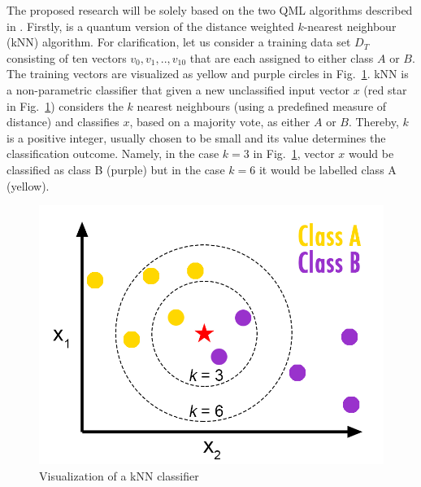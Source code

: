 \documentclass[a4paper]{article}
\newcommand*{\0}{$\ket{0}$}
\newcommand*{\1}{$\ket{1}$}
\begin{document}
The proposed research will be solely based on the two QML algorithms described in \cite{Schuld2014, Schuld2016}. Firstly, \cite{Schuld2014} is a quantum version of the distance weighted $k$-nearest neighbour (kNN) algorithm. For clarification, let us consider a training data set ${D}_{T}$ consisting of ten vectors ${v}_{0}, {v}_{1},..,{v}_{10}$ that are each assigned to either class $A$ or $B$. The training vectors are visualized as yellow and purple circles in Fig.~\ref{fig:knnconcept}. kNN is a non-parametric classifier that given a new unclassified input vector $x$ (red star in Fig.~\ref{fig:knnconcept}) considers the $k$ nearest neighbours (using a predefined measure of distance) and classifies $x$, based on a majority vote, as either $A$ or $B$. Thereby, $k$ is a positive integer, usually chosen to be small and its value determines the classification outcome. Namely, in the case $k = 3$ in Fig.~\ref{fig:knnconcept}, vector $x$ would be classified as class B (purple) but in the case $k = 6$ it would be labelled class A (yellow).

\begin{figure}[!ht]
      \centering
       \includegraphics[scale=0.55]{knn-concept.png}
       \caption[caption for kNN]{\label{fig:knnconcept} Visualization of a kNN classifier\footnotemark[1]}
\end{figure}

\end{document}
